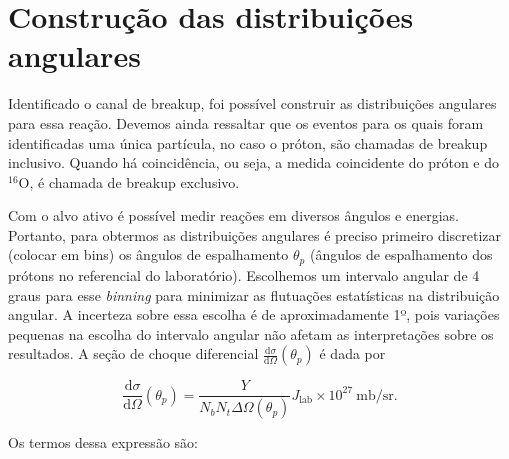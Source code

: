 \documentclass[a4paper,12pt,oneside]{book}
\begin{document}
\section{Construção das distribuições angulares}\label{sec:sec_choque}

\par Identificado o canal de breakup, foi possível construir as distribuições angulares para essa reação. Devemos ainda ressaltar que os eventos para os quais foram identificadas uma única partícula, no caso o próton, são chamadas de breakup inclusivo. Quando há coincidência, ou seja, a medida coincidente do próton e do $^{16}$O, é chamada de breakup exclusivo.


\par Com o alvo ativo é possível medir reações em diversos ângulos e energias. Portanto, para obtermos as distribuições  angulares é preciso primeiro discretizar (colocar em bins) os ângulos de espalhamento $\theta_p$ (ângulos de espalhamento dos prótons no referencial do laboratório). Escolhemos um intervalo angular de 4 graus para esse \textit{binning} para minimizar as flutuações estatísticas na distribuição angular. A incerteza sobre essa escolha é de aproximadamente 1º, pois variações pequenas na escolha do intervalo angular não afetam as interpretações sobre os resultados. A seção de choque diferencial $\frac{\mathrm{d}\sigma}{\mathrm{d}\Omega} (\theta_p)$ é dada por \cite{zamora_mater}

\begin{equation}\label{eq:cross_section}
	\frac{\mathrm{d}\sigma}{\mathrm{d}\Omega} (\theta_p) = \frac{Y}{N_bN_t\Delta\Omega(\theta_p)} J_{\mathrm{lab}} \times 10^{27} \:  \mathrm{mb/sr}.
\end{equation}

\par Os termos dessa expressão são:
\end{document}
